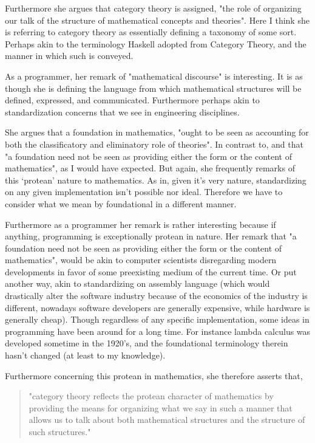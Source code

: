 Furthermore she argues that category theory is assigned, "the role of organizing our talk of the structure of mathematical concepts and theories". Here I think she is referring to category theory as essentially defining a taxonomy of some sort. Perhaps akin to the terminology Haskell adopted from Category Theory, and the manner in which such is conveyed. 

As a programmer, her remark of "mathematical discourse" is interesting. It is as though she is defining the language from which mathematical structures will be defined, expressed, and communicated. Furthermore perhaps akin to standardization concerns that we see in engineering disciplines.

She argues that a foundation in mathematics, "ought to be seen as accounting for both the classificatory and eliminatory role of theories". In contrast to, and that "a foundation need not be seen as providing either the form or the content of mathematics", as I would have expected. But again, she frequently remarks of this ‘protean’ nature to mathematics. As in, given it’s very nature, standardizing on any given implementation isn’t possible nor ideal. Therefore we have to consider what we mean by foundational in a different manner. 

Furthermore as a programmer her remark is rather interesting because if anything, programming is exceptionally protean in nature. Her remark that "a foundation need not be seen as providing either the form or the content of mathematics", would be akin to computer scientists disregarding modern developments in favor of some preexisting medium of the current time. Or put another way, akin to standardizing on assembly language (which would drastically alter the software industry because of the economics of the industry is different, nowadays software developers are generally expensive, while hardware is generally cheap). Though regardless of any specific implementation, some ideas in programming have been around for a long time. For instance lambda calculus was developed sometime in the 1920’s, and the foundational terminology therein hasn’t changed (at least to my knowledge). 

Furthermore concerning this protean in mathematics, she therefore asserts that, 
\begin{quotation}
"category theory reflects the protean character of mathematics by providing the means for organizing what we say in such a manner that allows us to talk about both mathematical structures and the structure of such structures."  
\end{quotation}

